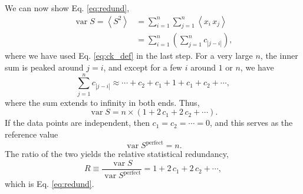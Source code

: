 \documentclass[12pt]{article}
\begin{document}
We can now show Eq. \eqref{eq:redund},
%
$$
\begin{aligned}
\operatorname{var} S
=
\left\langle S^2 \right\rangle
&=
\sum_{i = 1}^n
  \sum_{j = 1}^n
    \left\langle x_i \, x_j \right\rangle
\\
&=
\sum_{i = 1}^n
\left(
\sum_{j = 1}^n
c_{ |j - i| }
\right),
\end{aligned}
$$
%
where we have used Eq. \eqref{eq:ck_def}
in the last step.
%
For a very large $n$,
the inner sum is peaked around $j = i$,
and except for a few $i$ around $1$ or $n$,
we have
$$
\sum_{j = 1}^n c_{ | j - i | }
\approx
\cdots + c_2 + c_1 + 1 + c_1 + c_2 + \cdots,
$$
where the sum extends to infinity in both ends.
%
Thus,
\begin{equation}
  \operatorname{var} S
  =
  n \times ( 1 + 2 \, c_1 + 2 \, c_2 + \cdots ).
  \label{eq:varS}
\end{equation}
If the data points are independent, then $c_1 = c_2 = \cdots = 0$,
and this serves as the reference value
\begin{equation}
  \operatorname{var} S^\mathrm{perfect}
  =
  n
  .
\end{equation}
%
The ratio of the two yields the relative statistical redundancy,
$$
R \equiv
\frac{ \operatorname{var} S }
     { \operatorname{var} S^{ \mathrm{perfect} } }
=
1 + 2 \, c_1 + 2 \, c_2 + \cdots
,
$$
which is Eq. \eqref{eq:redund}.
\end{document}

